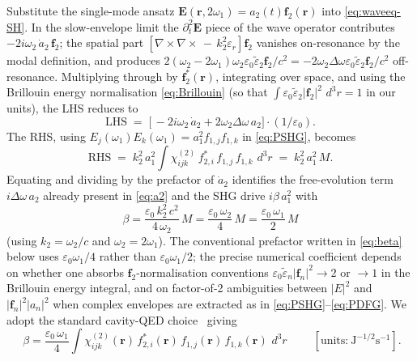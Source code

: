 \documentclass[11pt,a4paper]{article}
\newcommand{\eps}{\varepsilon}
\newcommand{\bvec}[1]{\mathbf{#1}}
\newcommand{\f}{\bvec{f}}
\newcommand{\ri}{\bvec{r}}
\newcommand{\dthreer}{\,d^{3}r}
\newcommand{\chitwo}{\chi^{(2)}}
\newcommand{\Dom}{\Delta\omega}
\begin{document}
Substitute the single-mode ansatz $\mathbf E(\ri,2\omega_1)=a_2(t)\f_2(\ri)$
into \eqref{eq:waveeq-SH}.  In the slow-envelope limit the
$\partial_t^{2}\mathbf E$ piece of the wave operator contributes
$-2i\omega_2\,\dot a_2\,\f_2$; the spatial part
$[\nabla\!\times\!\nabla\!\times\,-\,k_2^{2}\eps_r]\f_2$ vanishes
on-resonance by the modal definition, and produces $2(\omega_2-2\omega_1)
\omega_2 \eps_0 \tilde\eps_2 \f_2/c^{2}=-2\omega_2\Dom \eps_0\tilde\eps_2\f_2/c^{2}$
off-resonance.  Multiplying through by $\f_2^*(\ri)$, integrating
over space, and using the Brillouin energy normalisation
\eqref{eq:Brillouin} (so that $\int \eps_0 \tilde\eps_2 |\f_2|^{2}\,\dthreer
=1$ in our units), the LHS reduces to
\begin{equation*}
  \mathrm{LHS}\;=\;\bigl[\,-2i\omega_2\,\dot a_2 + 2\omega_2\Dom\,a_2\bigr]\cdot
                   (1/\eps_0).
\end{equation*}
The RHS, using $E_j(\omega_1)E_k(\omega_1)=a_1^{2}f_{1,j}f_{1,k}$ in
\eqref{eq:PSHG}, becomes
\begin{equation*}
  \mathrm{RHS}\;=\;k_2^{2}\,a_1^{2}\!\int\!\chitwo_{ijk}\,f_{2,i}^{*}\,f_{1,j}\,f_{1,k}\,\dthreer
            \;=\;k_2^{2}\,a_1^{2}\,M.
\end{equation*}
Equating and dividing by the prefactor of $\dot a_2$ identifies the
free-evolution term $i\Dom\,a_2$ already present in \eqref{eq:a2} and
the SHG drive $i\beta\,a_1^{2}$ with
\begin{equation*}
  \beta = \frac{\eps_0\,k_2^{2}\,c^{2}}{4\,\omega_2}\,M
        = \frac{\eps_0\,\omega_2}{4}\,M
        = \frac{\eps_0\,\omega_1}{2}\,M
\end{equation*}
(using $k_2=\omega_2/c$ and $\omega_2=2\omega_1$).  The conventional
prefactor written in \eqref{eq:beta} below uses $\eps_0\omega_1/4$
rather than $\eps_0\omega_1/2$; the precise numerical coefficient
depends on whether one absorbs $\f_2$-normalisation conventions
$\eps_0\tilde\eps_n |\f_n|^2\to 2$ or $\to 1$ in the Brillouin energy
integral, and on factor-of-2 ambiguities between $|E|^{2}$ and
$|\f_n|^2 |a_n|^2$ when complex envelopes are extracted as in
\eqref{eq:PSHG}--\eqref{eq:PDFG}.  We adopt the standard cavity-QED
choice~\cite{Rodriguez2007,SuhWangFan2004} giving
\begin{equation}
  \boxed{\;\beta=\frac{\eps_0\,\omega_1}{4}\!\int\!\chitwo_{ijk}(\ri)\,
                f_{2,i}^*(\ri)\,f_{1,j}(\ri)\,f_{1,k}(\ri)\,\dthreer\;}
  \qquad[\text{units:}\ \mathrm{J}^{-1/2}\mathrm{s}^{-1}].
\label{eq:beta}
\end{equation}
\end{document}
